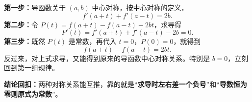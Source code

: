 \begin{proofbox}
  \textbf{第一步：}导函数关于 $(a,b)$ 中心对称，按中心对称的定义，
  \[
    f'(a+t)+f'(a-t)=2b.
  \]
  \textbf{第二步：}令 $P(t)=f(a+t)-f(a-t)-2bt$，求导得
  \[
    P'(t)=f'(a+t)+f'(a-t)-2b=0.
  \]
  \textbf{第三步：}既然 $P(t)$ 是常数，再代入 $t=0$，$P(0)=0$，就得到
  \[
    \boxed{f(a+t)-f(a-t)=2bt.}
  \]
  反过来，对上式求导，又能得到原来的导函数中心对称关系。特别是 $b=0$，立刻回到第一组规律。
  \begin{center}
  
  \end{center}
  \textbf{结论回扣：}两种对称关系能互推，靠的就是“\textbf{求导时左右差一个负号}”和“\textbf{导数恒为零则原式为常数}”。
\end{proofbox}
